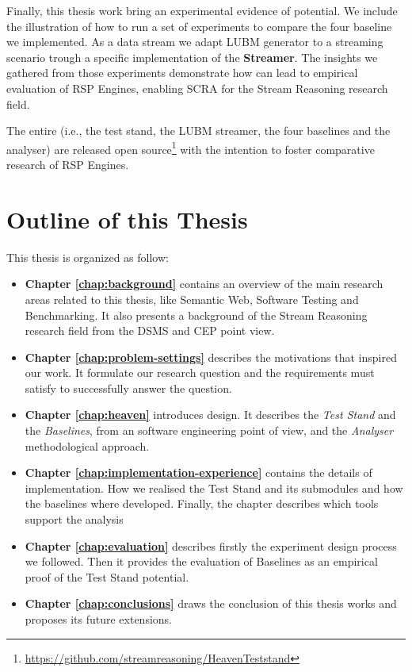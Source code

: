 Finally, this thesis work bring an experimental evidence of \name potential. We include the illustration of how to run a set of experiments to compare the four baseline we implemented. As a data stream we adapt LUBM generator to a streaming scenario trough a specific implementation of the \textbf{Streamer}. The insights we gathered from those experiments demonstrate how \name can lead to empirical evaluation of RSP Engines, enabling SCRA for the Stream Reasoning research field.

The entire \name (i.e., the test stand, the LUBM streamer, the four baselines and the analyser) are released open source\footnote{\url{https://github.com/streamreasoning/HeavenTeststand}} with the intention to foster comparative research of RSP Engines.

\section{Outline of this Thesis}\label{sec:thesis-structure-intro}

This thesis is organized as follow:

\begin{itemize}

\item \textbf{Chapter \ref{chap:background}} contains an overview of the main research areas related to this thesis, like Semantic Web, Software Testing and Benchmarking. It also presents a background of the Stream Reasoning research field from the DSMS and CEP point view.
\item \textbf{Chapter \ref{chap:problem-settings}} describes the motivations that inspired our work. It formulate our research question and the requirements \name must satisfy to successfully answer the question.
\item \textbf{Chapter \ref{chap:heaven}} introduces \name design. It describes the \textit{Test Stand} and the \textit{Baselines}, from an software engineering point of view, and the \textit{Analyser} methodological approach.
\item \textbf{Chapter \ref{chap:implementation-experience}} contains the details of \name implementation. How we realised the Test Stand and its submodules and how the baselines where developed. Finally, the chapter describes which tools support the analysis %
\item \textbf{Chapter \ref{chap:evaluation}} describes firstly the experiment design process we followed. Then it provides the evaluation of \name Baselines as an empirical proof of the Test Stand potential.
\item \textbf{Chapter \ref{chap:conclusions}} draws the conclusion of this thesis works and proposes its future extensions.
\end{itemize}